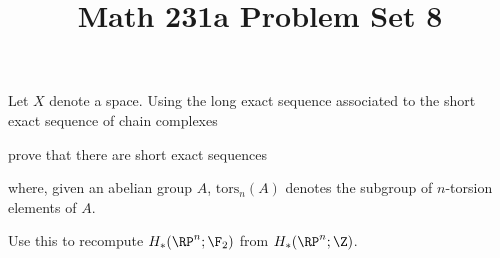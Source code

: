 \documentclass[11pt,letterpaper]{article}
\title{\textbf{Math 231a Problem Set 8}}
\begin{document}
\maketitle

\begin{problem}
    Let $X$ denote a space. Using the long exact sequence associated to the short exact sequence of chain complexes
    \begin{center}
    \end{center} 
    prove that there are short exact sequences
    \begin{center}
    \end{center}
    where, given an abelian group $A$, $\text{tors}_n(A)$ denotes the subgroup of $n$-torsion elements of $A$.

    \quad Use this to recompute $H_*(\RP^n; \F_2)$ from $H_*(\RP^n; \Z)$.
\end{problem}
\end{document}
